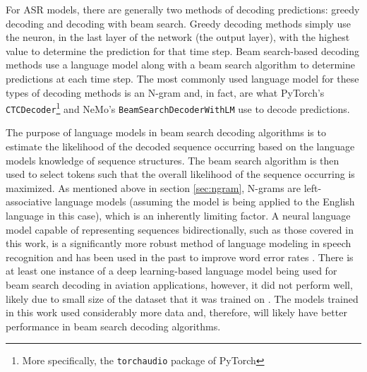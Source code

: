\documentclass[12pt]{article}
\begin{document}
For ASR models, there are generally two methods of decoding predictions: greedy decoding and decoding with beam search. Greedy decoding methods simply
use the neuron, in the last layer of the network (the output layer), with the highest value to determine the prediction for that time step. Beam
search-based decoding methods use a language model along with a beam search algorithm to determine predictions at each time step. The most commonly
used language model for these types of decoding methods is an N-gram and, in fact, are what PyTorch's \lstinline|CTCDecoder|\footnote{More
    specifically, the \lstinline|torchaudio| package of PyTorch} \cite{paszke_pytorch_2019} and NeMo's \lstinline|BeamSearchDecoderWithLM|
\cite{kuchaiev_nemo_2019} use to decode predictions.

The purpose of language models in beam search decoding algorithms is to estimate the likelihood of the decoded sequence occurring based on the
language models knowledge of sequence structures. The beam search algorithm is then used to select tokens such that the overall likelihood of the
sequence occurring is maximized. As mentioned above in section \ref{sec:ngram}, N-grams are left-associative language models (assuming the model is
being applied to the English language in this case), which is an inherently limiting factor. A neural language model capable of representing
sequences bidirectionally, such as those covered in this work, is a significantly more robust method of language modeling in speech recognition and
has been used in the past to improve word error rates \cite{kriman_quartznet_2020,majumdar_citrinet_2021}. There is at least one instance of a deep
learning-based language model being used for beam search decoding in aviation applications, however, it did not perform well, likely due to small
size of the dataset that it was trained on \cite{pellegrini_airbus_2019}. The models trained in this work used considerably more data and, therefore,
will likely have better performance in beam search decoding algorithms.

\newpage


\end{document}
